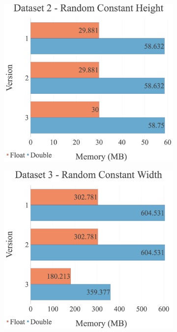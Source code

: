 \begin{figure}[H]
\begin{adjustwidth}{-2cm}{-2cm}
\begin{subfigure}{.62\textwidth}
\end{subfigure}
\par\bigskip
\par\bigskip
\begin{subfigure}{.62\textwidth}
  \centering
  \includegraphics[width=1\textwidth]{img/experiments/mem-multi-versions-2_RANDCONSTHEIGHT.png}
\end{subfigure}
\begin{subfigure}{.62\textwidth}
  \centering
  \includegraphics[width=1\textwidth]{img/experiments/mem-multi-versions-3_RANDCONSTWIDTH.png}
\end{subfigure}
\end{adjustwidth}
\end{figure}

